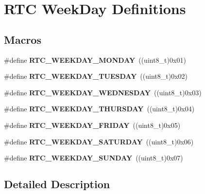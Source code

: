 \hypertarget{group___r_t_c___week_day___definitions}{}\section{R\+TC Week\+Day Definitions}
\label{group___r_t_c___week_day___definitions}
\subsection*{Macros}
\begin{DoxyCompactItemize}
\item 
\mbox{\label{group___r_t_c___week_day___definitions_ga9d74c5e20a481db4f4da69f083b768bf}} 
\#define {\bfseries R\+T\+C\+\_\+\+W\+E\+E\+K\+D\+A\+Y\+\_\+\+M\+O\+N\+D\+AY}~((uint8\+\_\+t)0x01)
\item 
\mbox{\label{group___r_t_c___week_day___definitions_gaf6b6e124a2e74317448abbfb1943e8cc}} 
\#define {\bfseries R\+T\+C\+\_\+\+W\+E\+E\+K\+D\+A\+Y\+\_\+\+T\+U\+E\+S\+D\+AY}~((uint8\+\_\+t)0x02)
\item 
\mbox{\label{group___r_t_c___week_day___definitions_ga0e8a7c338ffda7c9dd47003762d7054c}} 
\#define {\bfseries R\+T\+C\+\_\+\+W\+E\+E\+K\+D\+A\+Y\+\_\+\+W\+E\+D\+N\+E\+S\+D\+AY}~((uint8\+\_\+t)0x03)
\item 
\mbox{\label{group___r_t_c___week_day___definitions_gab166c84a54ace04f6849a8d0e1764107}} 
\#define {\bfseries R\+T\+C\+\_\+\+W\+E\+E\+K\+D\+A\+Y\+\_\+\+T\+H\+U\+R\+S\+D\+AY}~((uint8\+\_\+t)0x04)
\item 
\mbox{\label{group___r_t_c___week_day___definitions_ga3755707d628f4664c30d02fd2a2f0182}} 
\#define {\bfseries R\+T\+C\+\_\+\+W\+E\+E\+K\+D\+A\+Y\+\_\+\+F\+R\+I\+D\+AY}~((uint8\+\_\+t)0x05)
\item 
\mbox{\label{group___r_t_c___week_day___definitions_ga3acccb86a8429fea22f2ac46470b5e55}} 
\#define {\bfseries R\+T\+C\+\_\+\+W\+E\+E\+K\+D\+A\+Y\+\_\+\+S\+A\+T\+U\+R\+D\+AY}~((uint8\+\_\+t)0x06)
\item 
\mbox{\label{group___r_t_c___week_day___definitions_gadab2da4b8aa50c86d68781b379b75783}} 
\#define {\bfseries R\+T\+C\+\_\+\+W\+E\+E\+K\+D\+A\+Y\+\_\+\+S\+U\+N\+D\+AY}~((uint8\+\_\+t)0x07)
\end{DoxyCompactItemize}


\subsection{Detailed Description}
